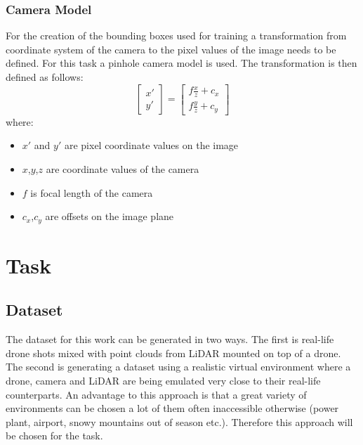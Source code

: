 \documentclass[twoside]{ctuthesis}
\theoremstyle{plain}
\theoremstyle{definition}
\theoremstyle{note}
\begin{document}
\section{Camera Model}
For the creation of the bounding boxes used for training a transformation from coordinate system of the camera to the pixel values of the image needs to be defined. For this task a pinhole camera model is used.
The transformation is then defined as follows:
\begin{equation}
	\begin{bmatrix}
		x'\\
		y'
	\end{bmatrix}=
	\begin{bmatrix}
		f\frac{x}{z}+c_x\\
		f\frac{y}{z}+c_y
	\end{bmatrix}
\end{equation}
where:
\begin{itemize}
	\item $x'$ and $y'$ are pixel coordinate values on the image
	\item $x$,$y$,$z$ are coordinate values of the camera
	\item $f$ is focal length of the camera
	\item $c_x$,$c_y$ are offsets on the image plane
\end{itemize}
\part{Task}
\chapter{Dataset}
The dataset for this work can be generated in two ways. The first is real-life drone shots mixed with point clouds from LiDAR mounted on top of a drone. The second is generating a dataset using a realistic virtual environment where a drone, camera and LiDAR are being emulated very close to their real-life counterparts. An advantage to this approach is that a great variety of environments can be chosen a lot of them often inaccessible otherwise (power plant, airport, snowy mountains out of season etc.). Therefore this approach will be chosen for the task.
\end{document}
